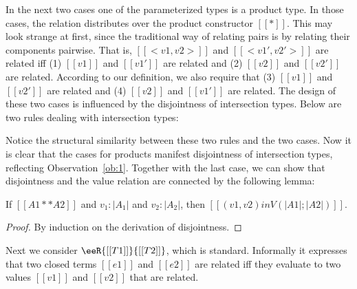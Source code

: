 In the next two cases one of the parameterized types is a product type. In those
cases, the relation distributes over the product constructor $[[*]]$. This may
look strange at first, since the traditional way of relating pairs is by
relating their components pairwise. That is, $[[<v1,v2>]]$ and $[[<v1', v2'>]]$
are related iff (1) $[[v1]]$ and $[[v1']]$ are related and (2) $[[v2]]$ and
$[[v2']]$ are related. According to our definition, we also require that (3)
$[[v1]]$ and $[[v2']]$ are related and (4) $[[v2]]$ and $[[v1']]$ are related.
The design of these two cases is influenced by the disjointness of intersection
types. Below are two rules dealing with intersection types:
Notice the structural similarity between these two rules and the two cases. Now
it is clear that the cases for products manifest disjointness of intersection
types, reflecting Observation~\ref{ob:1}. Together with the last case, we can
show that disjointness and the value relation are connected by the following
lemma:

\begin{lemma}\label{lemma:disjoint}
  If $[[A1 ** A2]]$ and $v_1 : |A_1|$ and $v_2 : |A_2|$, then $[[(v1, v2) in V (|A1| ; |A2|)]]$.
\end{lemma}
\begin{proof}
  By induction on the derivation of disjointness.
\end{proof}

Next we consider $\eeR{[[T1]]}{[[T2]]}$, which is standard. Informally it expresses
that two closed terms $[[e1]]$ and $[[e2]]$ are related iff
they evaluate to two values $[[v1]]$ and $[[v2]]$ that are related.



